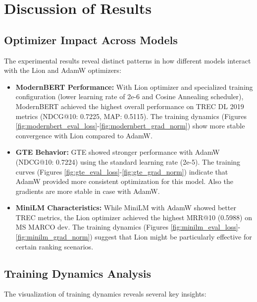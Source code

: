 \section{Discussion of Results}

\subsection{Optimizer Impact Across Models}

The experimental results reveal distinct patterns in how different models interact with the Lion and AdamW optimizers:

\begin{itemize}
    \item \textbf{ModernBERT Performance:} With Lion optimizer and specialized training configuration (lower learning rate of 2e-6 and Cosine Annealing scheduler), ModernBERT achieved the highest overall performance on TREC DL 2019 metrics (NDCG@10: 0.7225, MAP: 0.5115). The training dynamics (Figures \ref{fig:modernbert_eval_loss}-\ref{fig:modernbert_grad_norm}) show more stable convergence with Lion compared to AdamW.
    
    \item \textbf{GTE Behavior:} GTE showed stronger performance with AdamW (NDCG@10: 0.7224) using the standard learning rate (2e-5). The training curves (Figures \ref{fig:gte_eval_loss}-\ref{fig:gte_grad_norm}) indicate that AdamW provided more consistent optimization for this model. Also the gradients are more stable in case with AdamW.
    
    \item \textbf{MiniLM Characteristics:} While MiniLM with AdamW showed better TREC metrics, the Lion optimizer achieved the highest MRR@10 (0.5988) on MS MARCO dev. The training dynamics (Figures \ref{fig:minilm_eval_loss}-\ref{fig:minilm_grad_norm}) suggest that Lion might be particularly effective for certain ranking scenarios.
\end{itemize}

\subsection{Training Dynamics Analysis}

The visualization of training dynamics reveals several key insights:


